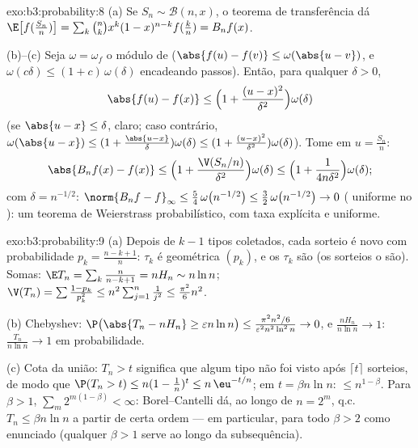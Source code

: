 \begin{solution}{exo:b3:probability:8}
(a) Se $S_n \sim \mathcal B(n, x)$, o teorema de transferência
dá $\E\bigl[f(\frac{S_n}n)\bigr] =
\sum_k\binom nkx^k(1-x)^{n-k}f(\frac kn) = B_nf(x)$.

(b)--(c) Seja $\omega = \omega_f$ o módulo de 
($\abs{f(u) - f(v)} \leq \omega(\abs{u - v})$, e $\omega(c
\delta) \leq (1 + c)\,\omega(\delta)$ encadeando passos).
Então, para qualquer $\delta > 0$,
\[
\abs{f(u) - f(x)} \leq \Bigl(1 + \frac{(u -
x)^2}{\delta^2}\Bigr)\omega(\delta)
\]
(se $\abs{u - x} \leq \delta$, claro; caso contrário,
$\omega(\abs{u-x}) \leq (1 + \frac{\abs{u-x}}\delta)
\omega(\delta) \leq (1 + \frac{(u-x)^2}{\delta^2})
\omega(\delta)$). Tome  em $u = \frac{S_n}n$:
\[
\abs{B_nf(x) - f(x)} \leq
\Bigl(1 + \frac{\V(S_n/n)}{\delta^2}\Bigr)\omega(\delta)
\leq \Bigl(1 + \frac{1}{4n\delta^2}\Bigr)\omega(\delta) ;
\]
com $\delta = n^{-1/2}$: $\norm{B_nf - f}_\infty \leq
\frac54\,\omega\bigl(n^{-1/2}\bigr) \leq
\frac32\,\omega\bigl(n^{-1/2}\bigr) \to 0$ (
uniforme no ): um teorema de Weierstrass
probabilístico, com taxa explícita e uniforme.
\end{solution}

\begin{solution}{exo:b3:probability:9}
(a) Depois de $k - 1$ tipos coletados, cada sorteio é novo com
probabilidade $p_k = \frac{n-k+1}n$: $\tau_k$ é geométrica
$(p_k)$, e os $\tau_k$ são  (os sorteios o são).
Somas: $\E T_n = \sum_k\frac n{n-k+1} = nH_n \sim n\ln n$;
$\V(T_n) = \sum\frac{1 - p_k}{p_k^2} \leq
n^2\sum_{j=1}^n\frac1{j^2} \leq \frac{\pi^2}6n^2$.

(b) Chebyshev: $\P\bigl(\abs{T_n - nH_n} \geq \varepsilon
n\ln n\bigr) \leq \frac{\pi^2n^2/6}{\varepsilon^2n^2\ln^2n}
\to 0$, e $\frac{nH_n}{n\ln n} \to 1$: $\frac{T_n}{n\ln n}
\to 1$ em probabilidade.

(c) Cota da união: $T_n > t$ significa que algum tipo não foi visto após
$\lceil t\rceil$ sorteios, de modo que $\P(T_n > t) \leq n(1 -
\frac1n)^{t} \leq n\,\eu^{-t/n}$; em $t = \beta n\ln n$:
$\leq n^{1 - \beta}$. Para $\beta > 1$, $\sum_m
2^{m(1-\beta)} < \infty$: Borel--Cantelli dá, ao longo de $n =
2^m$, q.c.\ $T_n \leq \beta n\ln n$ a partir de certa ordem --- em
particular, para todo $\beta > 2$ como enunciado (qualquer $\beta > 1$
serve ao longo da subsequência).
\end{solution}

